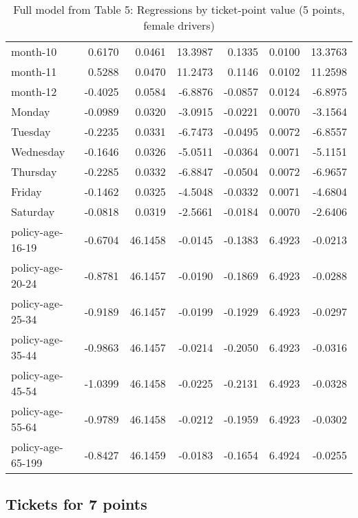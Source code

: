 \documentclass[10pt]{article}
\begin{document}
\begin{table}[ht]
\begin{tabular}{lrrrrrr}
  month-10 & 0.6170 & 0.0461 & 13.3987 & 0.1335 & 0.0100 & 13.3763 \\ 
  month-11 & 0.5288 & 0.0470 & 11.2473 & 0.1146 & 0.0102 & 11.2598 \\ 
  month-12 & -0.4025 & 0.0584 & -6.8876 & -0.0857 & 0.0124 & -6.8975 \\ 
  Monday & -0.0989 & 0.0320 & -3.0915 & -0.0221 & 0.0070 & -3.1564 \\ 
  Tuesday & -0.2235 & 0.0331 & -6.7473 & -0.0495 & 0.0072 & -6.8557 \\ 
  Wednesday & -0.1646 & 0.0326 & -5.0511 & -0.0364 & 0.0071 & -5.1151 \\ 
  Thursday & -0.2285 & 0.0332 & -6.8847 & -0.0504 & 0.0072 & -6.9657 \\ 
  Friday & -0.1462 & 0.0325 & -4.5048 & -0.0332 & 0.0071 & -4.6804 \\ 
  Saturday & -0.0818 & 0.0319 & -2.5661 & -0.0184 & 0.0070 & -2.6406 \\ 
  policy-age-16-19 & -0.6704 & 46.1458 & -0.0145 & -0.1383 & 6.4923 & -0.0213 \\ 
  policy-age-20-24 & -0.8781 & 46.1457 & -0.0190 & -0.1869 & 6.4923 & -0.0288 \\ 
  policy-age-25-34 & -0.9189 & 46.1457 & -0.0199 & -0.1929 & 6.4923 & -0.0297 \\ 
  policy-age-35-44 & -0.9863 & 46.1457 & -0.0214 & -0.2050 & 6.4923 & -0.0316 \\ 
  policy-age-45-54 & -1.0399 & 46.1458 & -0.0225 & -0.2131 & 6.4923 & -0.0328 \\ 
  policy-age-55-64 & -0.9789 & 46.1458 & -0.0212 & -0.1959 & 6.4923 & -0.0302 \\ 
  policy-age-65-199 & -0.8427 & 46.1459 & -0.0183 & -0.1654 & 6.4924 & -0.0255 \\ 
   \hline
\end{tabular}
\caption{Full model from Table 5: Regressions by ticket-point value (5 points, female drivers)} 
\label{tab_5_5_pts_F}
\end{table}


\clearpage
\pagebreak




\subsection{Tickets for 7 points}
\end{document}

